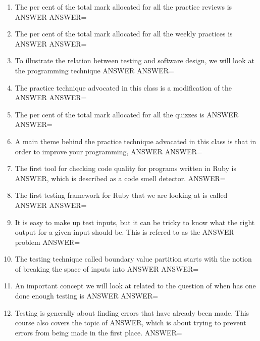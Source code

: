 \documentclass{exam}
\begin{document}
\begin{enumerate}
\item The per cent of the total mark allocated for all the practice reviews is ANSWER\newline
ANSWER=
\item The per cent of the total mark allocated for all the weekly practices is ANSWER\newline
ANSWER=
\item To illustrate the relation between testing and software design, we will look at the programming technique ANSWER\newline
ANSWER=
\item The practice technique advocated in this class is a modification of the ANSWER\newline
ANSWER=
\item The per cent of the total mark allocated for all the quizzes is ANSWER\newline
ANSWER=
\item A main theme behind the practice technique advocated in this class is that in order to improve your programming, ANSWER\newline
ANSWER=
\item The first tool for checking code quality for programs written in Ruby is ANSWER, which is described as a code smell detector.\newline
ANSWER=
\item The first testing framework for Ruby that we are looking at is called ANSWER\newline
ANSWER=
\item It is easy to make up test inputs, but it can be tricky to know what the right output for a given input should be.  This is refered to as the ANSWER problem\newline
ANSWER=
\item The testing technique called boundary value partition starts with the notion of breaking the space of inputs into ANSWER\newline
ANSWER=
\item An important concept we will look at related to the question of when has one done enough testing is ANSWER\newline
ANSWER=
\item Testing is generally about finding errors that have already been made.  This course also covers the topic of ANSWER, which is about trying to prevent errors from being made in the first place.\newline
ANSWER=

\end{enumerate}
\end{document}
